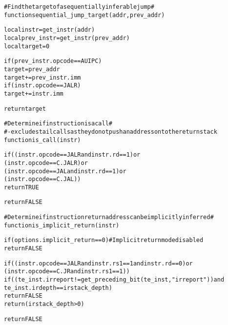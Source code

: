 \begin{alltt}
# Find the target of a sequentially inferable jump #
function sequential_jump_target (addr, prev_addr)

  local instr      = get_instr(addr)
  local prev_instr = get_instr(prev_addr)
  local target     = 0

  if (prev_instr.opcode == AUIPC)
    target = prev_addr
  target += prev_instr.imm
  if (instr.opcode == JALR)
    target += instr.imm

  return target

# Determine if instruction is a call #
# - excludes tail calls as they do not push an address onto the return stack
function is_call (instr)

  if ((instr.opcode == JALR and instr.rd == 1) or
      (instr.opcode == C.JALR)                 or
      (instr.opcode == JAL  and instr.rd == 1) or
      (instr.opcode == C.JAL))
    return TRUE

  return FALSE

# Determine if instruction return address can be implicitly inferred #
function is_implicit_return (instr)

  if (options.implicit_return == 0) # Implicit return mode disabled
    return FALSE

  if ((instr.opcode == JALR and instr.rs1 == 1 and instr.rd == 0) or
      (instr.opcode == C.JR and instr.rs1 == 1))
    if ((te_inst.irreport != get_preceding_bit(te_inst, "irreport")) and 
         te_inst.irdepth == irstack_depth)
      return FALSE 
    return (irstack_depth > 0)

  return FALSE
\end{alltt}

\pagebreak

